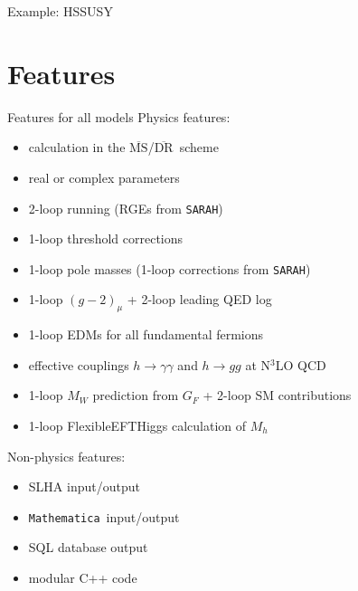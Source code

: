 \documentclass[hyperref={pdfpagelabels=false},ngerman]{beamer}
\newcommand{\DRbar}{\ensuremath{\overline{\text{DR}}}}
\newcommand{\MSbar}{\ensuremath{\overline{\text{MS}}}}
\newcommand{\SARAH}{\texttt{SARAH}}
\newcommand{\Mathematica}{\texttt{Mathematica}}
\begin{document}
\begin{frame}{Example: HSSUSY}
  \begin{center}
  \end{center}
\end{frame}

\section{Features}

\begin{frame}{Features for all models}
  Physics features:
  \begin{itemize}
  \item calculation in the \MSbar/\DRbar\ scheme
  \item real or complex parameters
  \item 2-loop running (RGEs from \SARAH)
  \item 1-loop threshold corrections
  \item 1-loop pole masses (1-loop corrections from \SARAH)
  \item 1-loop $(g-2)_\mu$ + 2-loop leading QED log
  \item 1-loop EDMs for all fundamental fermions
  \item effective couplings $h\rightarrow \gamma\gamma$ and
    $h\rightarrow gg$ at N$^3$LO QCD
  \item 1-loop $M_W$ prediction from $G_F$ + 2-loop SM contributions
  \item 1-loop FlexibleEFTHiggs calculation of $M_h$
  \end{itemize}
  Non-physics features:
  \begin{itemize}
    \item SLHA input/output
    \item \Mathematica\ input/output
    \item SQL database output
    \item modular C++ code
  \end{itemize}
\end{frame}
\end{document}
